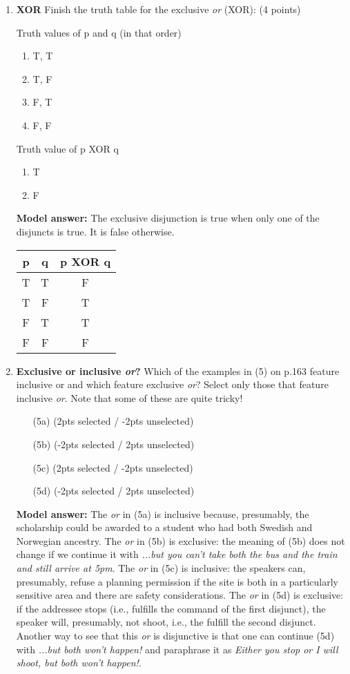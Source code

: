 \documentclass[a4,11pt]{article}
\newcommand{\6}{\mbox{$[\hspace*{-.6mm}[$}}
\newcommand{\9}{\mbox{$]\hspace*{-.6mm}]$}}
\begin{document}
\begin{enumerate}[leftmargin = 12pt]
\item { \bf  XOR} Finish the truth table for the exclusive \textit{or} (XOR): (4 points)


Truth values of p and q (in that order)
\begin{enumerate}[noitemsep]
\item T, T
\item T, F
\item F, T 
\item F, F
\end{enumerate}

Truth value of p XOR q
\begin{enumerate}[noitemsep]
\item T
\item F
\end{enumerate}

{ \bf Model answer:} The exclusive disjunction is true when only one of the disjuncts is true. It is false otherwise. \\
\begin{tabular}{ccc}
p & q &  p XOR q \\
\hline
 T & T & F \\
T & F & T \\
 F & T  & T \\
F & F & F
\end{tabular}


\item {\bf Exclusive or inclusive {\em or}?} Which of the examples in (5) on p.163 feature inclusive or and which feature exclusive {\em or}? Select only those that feature inclusive {\em or}. Note that some of these are quite tricky! 

\begin{enumerate}[noitemsep]
\item[(5a)] (2pts selected / -2pts unselected)
\item[(5b)] (-2pts selected / 2pts unselected)
\item[(5c)] (2pts selected / -2pts unselected)
\item[(5d)] (-2pts selected / 2pts unselected)
\end{enumerate}

{\bf Model answer:} The {\em or} in (5a) is inclusive because, presumably, the scholarship could be awarded to a student who had both Swedish and Norwegian ancestry. The {\em or} in (5b) is exclusive: the meaning of (5b) does not change if we continue it with {\em ...but you can't take both the bus and the train and still arrive at 5pm}. The {\em or} in (5c) is inclusive: the speakers can, presumably, refuse a planning permission if the site is both in a particularly sensitive area and there are safety considerations. The {\em or} in (5d) is exclusive: if the addressee stops (i.e., fulfills the command of the first disjunct), the speaker will, presumably, not shoot, i.e., the fulfill the second disjunct. Another way to see that this {\em or} is disjunctive is that one can continue (5d) with {\em ...but both won't happen!} and paraphrase it as {\em Either you stop or I will shoot, but both won't happen!}. 



\end{enumerate}
\end{document}
